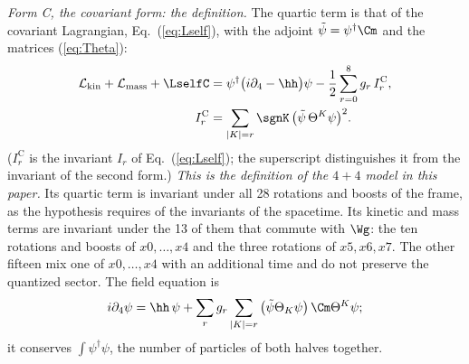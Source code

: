 \emph{Form C, the covariant form: the definition.} The quartic term is that of the covariant
Lagrangian, Eq.~(\ref{eq:Lself}), with the adjoint $\tilde\psi=\psi^\dagger\Cm$ and the matrices
(\ref{eq:Theta}):
\begin{equation}
\begin{aligned}
\mathcal L_{\mathrm{kin}}+\mathcal L_{\mathrm{mass}}+\LselfC&=\psi^\dagger\big(i\partial_4-\hh\big)\psi-\frac12\sum_{r=0}^{8}g_r\,I_r^{\mathrm C},\\
I_r^{\mathrm C}&=\sum_{|K|=r}\sgnK\,\big(\tilde\psi\,\Theta^{K}\psi\big)^{2} .
\end{aligned}
\label{eq:LselfC}
\end{equation}
($I_r^{\mathrm C}$ is the invariant $I_r$ of Eq.~(\ref{eq:Lself}); the superscript distinguishes it
from the invariant of the second form.) \emph{This is the definition of the $4+4$ model in this
paper.} Its quartic term is invariant under all 28 rotations and boosts of the frame, as the
hypothesis requires of the invariants of the spacetime. Its kinetic and mass terms are invariant
under the 13 of them that commute with $\Wg$: the ten rotations and boosts of $x0,\dots,x4$ and the
three rotations of $x5,x6,x7$. The other fifteen mix one of $x0,\dots,x4$ with an additional time
and do not preserve the quantized sector. The field equation is
\begin{equation}
i\partial_4\psi=\hh\,\psi+\sum_rg_r\sum_{|K|=r}\big(\tilde\psi\Theta_K\psi\big)\,\Cm\Theta^{K}\psi ;
\label{eq:fieldC}
\end{equation}
it conserves $\int\psi^\dagger\psi$, the number of particles of both halves together.

